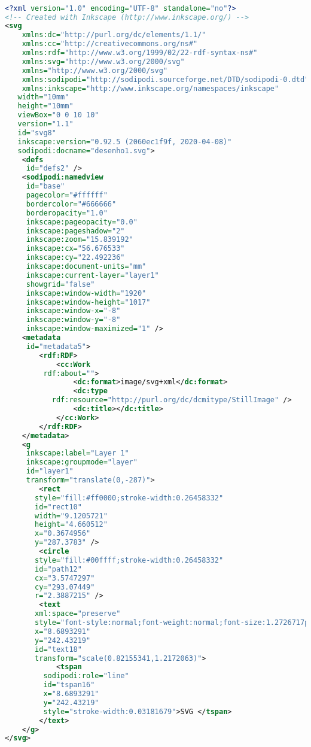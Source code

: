 \begin{lstlisting}[caption=Exemplo de um SVG,label={xml4},language=XML]

<?xml version="1.0" encoding="UTF-8" standalone="no"?>
<!-- Created with Inkscape (http://www.inkscape.org/) -->
<svg
	xmlns:dc="http://purl.org/dc/elements/1.1/"
	xmlns:cc="http://creativecommons.org/ns#"
	xmlns:rdf="http://www.w3.org/1999/02/22-rdf-syntax-ns#"
	xmlns:svg="http://www.w3.org/2000/svg"
	xmlns="http://www.w3.org/2000/svg"
	xmlns:sodipodi="http://sodipodi.sourceforge.net/DTD/sodipodi-0.dtd"
	xmlns:inkscape="http://www.inkscape.org/namespaces/inkscape"
   width="10mm"
   height="10mm"
   viewBox="0 0 10 10"
   version="1.1"
   id="svg8"
   inkscape:version="0.92.5 (2060ec1f9f, 2020-04-08)"
   sodipodi:docname="desenho1.svg">
	<defs
     id="defs2" />
	<sodipodi:namedview
     id="base"
     pagecolor="#ffffff"
     bordercolor="#666666"
     borderopacity="1.0"
     inkscape:pageopacity="0.0"
     inkscape:pageshadow="2"
     inkscape:zoom="15.839192"
     inkscape:cx="56.676533"
     inkscape:cy="22.492236"
     inkscape:document-units="mm"
     inkscape:current-layer="layer1"
     showgrid="false"
     inkscape:window-width="1920"
     inkscape:window-height="1017"
     inkscape:window-x="-8"
     inkscape:window-y="-8"
     inkscape:window-maximized="1" />
	<metadata
     id="metadata5">
		<rdf:RDF>
			<cc:Work
         rdf:about="">
				<dc:format>image/svg+xml</dc:format>
				<dc:type
           rdf:resource="http://purl.org/dc/dcmitype/StillImage" />
				<dc:title></dc:title>
			</cc:Work>
		</rdf:RDF>
	</metadata>
	<g
     inkscape:label="Layer 1"
     inkscape:groupmode="layer"
     id="layer1"
     transform="translate(0,-287)">
		<rect
       style="fill:#ff0000;stroke-width:0.26458332"
       id="rect10"
       width="9.1205721"
       height="4.660512"
       x="0.3674956"
       y="287.3783" />
		<circle
       style="fill:#00ffff;stroke-width:0.26458332"
       id="path12"
       cx="3.5747297"
       cy="293.07449"
       r="2.3887215" />
		<text
       xml:space="preserve"
       style="font-style:normal;font-weight:normal;font-size:1.2726717px;line-height:1.25;font-family:sans-serif;letter-spacing:0px;word-spacing:0px;fill:#000000;fill-opacity:1;stroke:none;stroke-width:0.03181679"
       x="8.6893291"
       y="242.43219"
       id="text18"
       transform="scale(0.82155341,1.2172063)">
			<tspan
         sodipodi:role="line"
         id="tspan16"
         x="8.6893291"
         y="242.43219"
         style="stroke-width:0.03181679">SVG </tspan>
		</text>
	</g>
</svg>


\end{lstlisting}